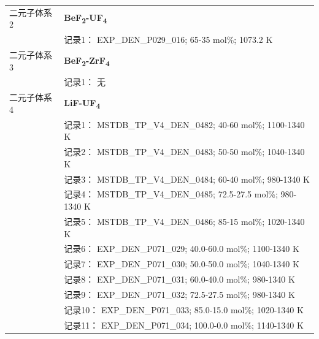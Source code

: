 \documentclass[12pt]{article}
\begin{document}
{\begin{longtable}[]{@{}
  >{\raggedright\arraybackslash}p{}
  >{\raggedright\arraybackslash}p{}@{}}
二元子体系 2  & \textbf{BeF\textsubscript{2}-UF\textsubscript{4}} \\
 & 记录1： EXP\_DEN\_P029\_016; 65-35 mol\%; 1073.2 K  \\

二元子体系 3 & \textbf{BeF\textsubscript{2}-ZrF\textsubscript{4}} \\
 & 记录1： 无 \\
二元子体系 4  & \textbf{LiF-UF\textsubscript{4}} \\
 & 记录1： MSTDB\_TP\_V4\_DEN\_0482; 40-60 mol\%; 1100-1340 K \\
 & 记录2： MSTDB\_TP\_V4\_DEN\_0483; 50-50 mol\%; 1040-1340 K \\
 & 记录3： MSTDB\_TP\_V4\_DEN\_0484; 60-40 mol\%; 980-1340 K \\
 & 记录4： MSTDB\_TP\_V4\_DEN\_0485; 72.5-27.5 mol\%; 980-1340 K \\
 & 记录5： MSTDB\_TP\_V4\_DEN\_0486; 85-15 mol\%; 1020-1340 K \\
 & 记录6： EXP\_DEN\_P071\_029; 40.0-60.0 mol\%; 1100-1340 K \\
 & 记录7： EXP\_DEN\_P071\_030; 50.0-50.0 mol\%; 1040-1340 K \\
 & 记录8： EXP\_DEN\_P071\_031; 60.0-40.0 mol\%; 980-1340 K \\
 & 记录9： EXP\_DEN\_P071\_032; 72.5-27.5 mol\%; 980-1340 K \\
 & 记录10： EXP\_DEN\_P071\_033; 85.0-15.0 mol\%; 1020-1340 K \\
 & 记录11： EXP\_DEN\_P071\_034; 100.0-0.0 mol\%; 1140-1340 K  \\


\end{longtable}}
\end{document}
